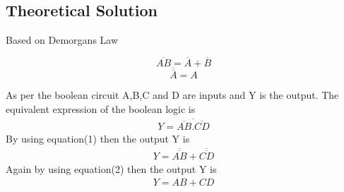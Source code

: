 \documentclass[journal,12pt,twocolumn]{IEEEtran}
\begin{document}
\subsection{Theoretical Solution}
    Based on Demorgans Law
    \begin{center}
    \begin{equation}
    \overline{AB} = \overline{A}+\overline{B}
    \end{equation}
    \begin{equation}
    \overline{\overline{A}}  = A
    \end{equation}
    \end{center}
    As per the boolean circuit A,B,C and D are inputs and Y is the output. The equivalent expression of the boolean logic is \\
    \begin{align*}
    Y  = \overline{\overline{AB}.\overline{CD}}
    \end{align*}
    By using equation(1) then the output Y is
    \begin{align*}
    Y  = \overline{\overline{AB}}+\overline{\overline{CD}}
    \end{align*}
    Again by using equation(2) then the output Y is 
    \begin{align*}
    Y  = AB + CD
    \end{align*}
    \label{fig:circuit}
\end{document}
